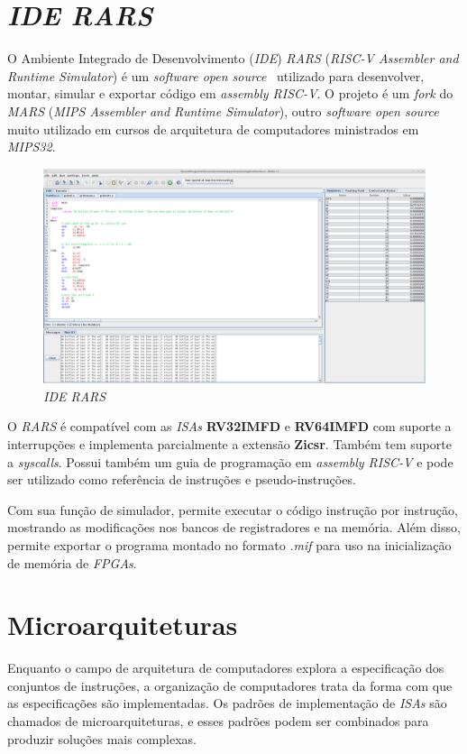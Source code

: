 \section{\textit{IDE RARS}}
{ O Ambiente Integrado de Desenvolvimento (\textit{IDE}) \textit{RARS}
    (\textit{RISC-V Assembler and Runtime Simulator}) é um \textit{software
    open source}~\cite{rars_git} utilizado para desenvolver, montar, simular e
    exportar código em \textit{assembly RISC-V}. O projeto é um \textit{fork}
    do \textit{MARS} (\textit{MIPS Assembler and Runtime Simulator}), outro
    \textit{software open source}~\cite{mars_site} muito utilizado em cursos
    de arquitetura de computadores ministrados em \textit{MIPS32}.
}
\begin{figure}[H]
\centering
    \includegraphics[width=.9\linewidth]{../images/rars.png}
    \caption{\textit{IDE RARS}}\label{fig:rars}
\end{figure}

{ O \textit{RARS} é compatível com as \textit{ISAs} \textbf{RV32IMFD} e
    \textbf{RV64IMFD} com suporte a interrupções e implementa parcialmente a
    extensão \textbf{Zicsr}. Também tem suporte a \textit{syscalls}. Possui
    também um guia de programação em \textit{assembly RISC-V} e pode ser
    utilizado como referência de instruções e pseudo-instruções.
}

{ Com sua função de simulador, permite executar o código instrução por instrução,
    mostrando as modificações nos bancos de registradores e na memória. Além
    disso, permite exportar o programa montado no formato \textit{.mif} para
    uso na inicialização de memória de \textit{FPGAs}.
}


\section{Microarquiteturas}
{ Enquanto o campo de arquitetura de computadores explora a especificação dos
    conjuntos de instruções, a organização de computadores trata da forma com que
    as especificações são implementadas. Os padrões de implementação de
    \textit{ISAs} são chamados de microarquiteturas, e esses padrões podem ser
    combinados para produzir soluções mais complexas.
}

